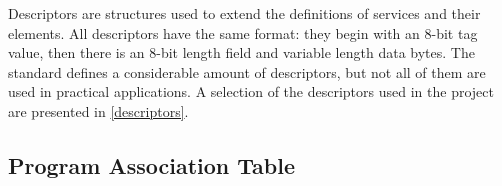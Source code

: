 \documentclass[
	12pt,				%
	openright,			%
	twoside,			%
	a4paper,			%
	brazil,
	french,				%
	english
	]{abntex2}
\begin{document}
Descriptors are structures used to extend the definitions of services and their elements. All descriptors have the same format: they begin with an 8-bit tag value, then there is an 8-bit length field and variable length data bytes. The standard defines a considerable amount of descriptors, but not all of them are used in practical applications. A selection of the descriptors used in the project are presented in \autoref{descriptors}.


\subsection{Program Association Table}
\end{document}
